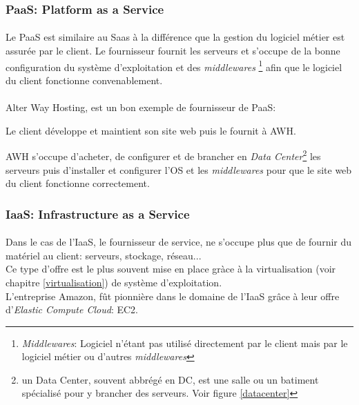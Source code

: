 \subsubsection{PaaS: Platform as a Service}
\paragraph*{}
Le PaaS est similaire au Saas à la différence que la gestion du logiciel métier est assurée par le client.
Le fournisseur fournit les serveurs et s'occupe de la bonne configuration du système d'exploitation et des \emph{middlewares}
\footnote{\emph{Middlewares}: Logiciel n'étant pas utilisé directement par le client mais par le logiciel métier ou d'autres \emph{middlewares}} afin
que le logiciel du client fonctionne convenablement.

\paragraph*{}
Alter Way Hosting, est un bon exemple de fournisseur de PaaS: \\
\begin{listi}
\item 	Le client développe et maintient son site web puis le fournit à AWH.\\
\item 	AWH s'occupe d'acheter, de configurer et de brancher en \emph{Data Center}\footnote{un Data Center, souvent abbrégé en DC, est une salle
		ou un batiment spécialisé pour y brancher des serveurs. Voir figure \ref{datacenter}} les serveurs puis d'installer et configurer l'OS et les \emph{middlewares} pour que
		le site web du client fonctionne correctement.
\end{listi}

\subsubsection{IaaS: Infrastructure as a Service}
\paragraph*{}
Dans le cas de l'IaaS, le fournisseur de service, ne s'occupe plus que de fournir du matériel au client: serveurs, stockage, réseau...
\\
Ce type d'offre est le plus souvent mise en place gràce à la virtualisation (voir chapitre \ref{virtualisation}) de système d'exploitation.
\\
L'entreprise Amazon, fût pionnière dans le domaine de l'IaaS grâce à leur offre d'\textsl{Elastic Compute Cloud}: EC2.

